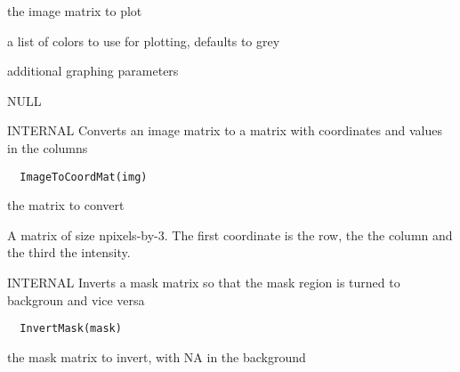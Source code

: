 \documentclass[a4paper]{book}
\begin{document}
%
\begin{Arguments}
\begin{ldescription}
\item[\code{img}] the image matrix to plot

\item[\code{col}] a list of colors to use for plotting, defaults
to grey

\item[\code{...}] additional graphing parameters
\end{ldescription}
\end{Arguments}
%
\begin{Value}
NULL
\end{Value}
%
\begin{Description}\relax
INTERNAL Converts an image matrix to a matrix with
coordinates and values in the columns
\end{Description}
%
\begin{Usage}
\begin{verbatim}
  ImageToCoordMat(img)
\end{verbatim}
\end{Usage}
%
\begin{Arguments}
\begin{ldescription}
\item[\code{img}] the matrix to convert
\end{ldescription}
\end{Arguments}
%
\begin{Value}
A matrix of size npixels-by-3. The first coordinate is
the row, the the column and the third the intensity.
\end{Value}
%
\begin{Description}\relax
INTERNAL Inverts a mask matrix so that the mask region is
turned to backgroun and vice versa
\end{Description}
%
\begin{Usage}
\begin{verbatim}
  InvertMask(mask)
\end{verbatim}
\end{Usage}
%
\begin{Arguments}
\begin{ldescription}
\item[\code{mask}] the mask matrix to invert, with NA in the
background
\end{ldescription}
\end{Arguments}
\end{document}
